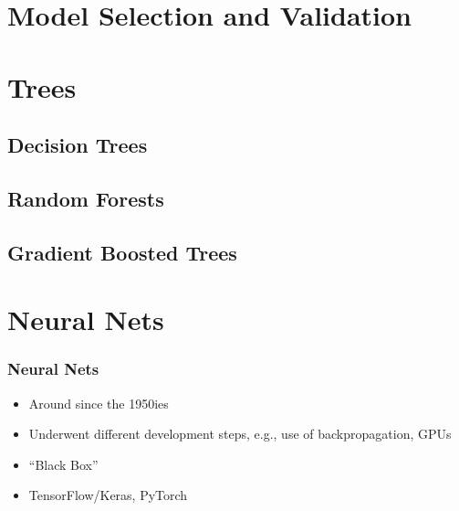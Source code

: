 \documentclass[
    utf8,
    aspectratio=169
]{beamer}  %
\begin{document}
\section{Model Selection and Validation}

\section{Trees}

\subsection{Decision Trees}

\subsection{Random Forests}

\subsection{Gradient Boosted Trees}

\section{Neural Nets}

\begin{frame}
	\frametitle{Neural Nets}
	\begin{itemize}
		\item Around since the 1950ies
		\item Underwent different development steps, e.g., use of backpropagation, GPUs
		\item ``Black Box''
		\item TensorFlow/Keras, PyTorch
	\end{itemize}
\end{frame}
\end{document}
